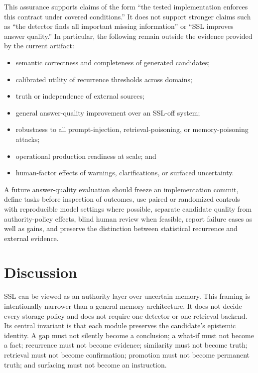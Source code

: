 \documentclass[11pt]{article}
\begin{document}
This assurance supports claims of the form ``the tested implementation enforces this contract under covered conditions.'' It does not support stronger claims such as ``the detector finds all important missing information'' or ``SSL improves answer quality.'' In particular, the following remain outside the evidence provided by the current artifact:
\begin{itemize}[leftmargin=1.5em]
  \item semantic correctness and completeness of generated candidates;
  \item calibrated utility of recurrence thresholds across domains;
  \item truth or independence of external sources;
  \item general answer-quality improvement over an SSL-off system;
  \item robustness to all prompt-injection, retrieval-poisoning, or memory-poisoning attacks;
  \item operational production readiness at scale; and
  \item human-factor effects of warnings, clarifications, or surfaced uncertainty.
\end{itemize}

A future answer-quality evaluation should freeze an implementation commit, define tasks before inspection of outcomes, use paired or randomized controls with reproducible model settings where possible, separate candidate quality from authority-policy effects, blind human review when feasible, report failure cases as well as gains, and preserve the distinction between statistical recurrence and external evidence.

\section{Discussion}

SSL can be viewed as an authority layer over uncertain memory. This framing is intentionally narrower than a general memory architecture. It does not decide every storage policy and does not require one detector or one retrieval backend. Its central invariant is that each module preserves the candidate's epistemic identity. A gap must not silently become a conclusion; a what-if must not become a fact; recurrence must not become evidence; similarity must not become truth; retrieval must not become confirmation; promotion must not become permanent truth; and surfacing must not become an instruction.
\end{document}
